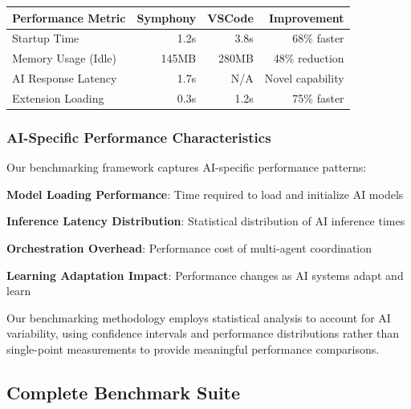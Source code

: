 \begin{center}
\begin{tabular}{@{}lrrr@{}}
\toprule
\textbf{Performance Metric} & \textbf{Symphony} & \textbf{VSCode} & \textbf{Improvement} \\
\midrule
Startup Time & 1.2s & 3.8s & 68\% faster \\
Memory Usage (Idle) & 145MB & 280MB & 48\% reduction \\
AI Response Latency & 1.7s & N/A & Novel capability \\
Extension Loading & 0.3s & 1.2s & 75\% faster \\
\bottomrule
\end{tabular}
\end{center}

\subsubsection*{AI-Specific Performance Characteristics}

Our benchmarking framework captures AI-specific performance patterns:

\begin{compactlist}
    \item \textbf{Model Loading Performance}: Time required to load and initialize AI models
    \item \textbf{Inference Latency Distribution}: Statistical distribution of AI inference times
    \item \textbf{Orchestration Overhead}: Performance cost of multi-agent coordination
    \item \textbf{Learning Adaptation Impact}: Performance changes as AI systems adapt and learn
\end{compactlist}

\begin{infobox}[title=Benchmarking Methodology]
Our benchmarking methodology employs statistical analysis to account for AI variability, using confidence intervals and performance distributions rather than single-point measurements to provide meaningful performance comparisons.
\end{infobox}

\subsection*{Complete Benchmark Suite}

